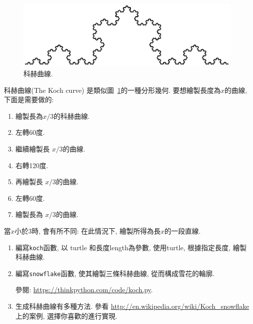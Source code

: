 \documentclass[10pt]{book}
\begin{document}
\begin{figure}
\centerline
{\includegraphics[scale=0.8]{figs/koch.pdf}}
\caption{科赫曲線.}
\label{fig.koch}
\end{figure}

\begin{exercise}

科赫曲線(The Koch curve) 是類似圖~\ref{fig.koch}的一種分形幾何. 
要想繪製長度為$x$的曲線, 下面是需要做的:

\begin{enumerate}

\item 繪製長為$x/3$的科赫曲線. 

\item 左轉60度. 

\item 繼續繪製長 $x/3$的曲線. 

\item 右轉120度. 

\item 再繪製長 $x/3$的曲線. 

\item 左轉60度. 

\item 繪製長為 $x/3$的曲線. 

\end{enumerate}

當$x$小於3時, 會有所不同:  在此情況下, 繪製所得為長$x$的一段直線. 

\begin{enumerate}

\item 編寫{\tt koch}函數, 以 turtle 和長度length為參數, 使用turtle, 根據指定長度, 繪製
科赫曲線. 

\item 編寫{\tt snowflake}函數, 使其繪製三條科赫曲線, 
從而構成雪花的輪廓.

參閱: \url{https://thinkpython.com/code/koch.py}.

\item 生成科赫曲線有多種方法. 參看
\url{http://en.wikipedia.org/wiki/Koch_snowflake} 上的案例, 選擇你喜歡的進行實現. 


\end{enumerate}
\end{exercise}
\end{document}
